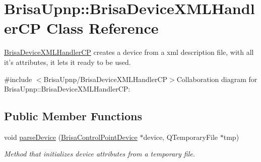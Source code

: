 \hypertarget{classBrisaUpnp_1_1BrisaDeviceXMLHandlerCP}{
\section{BrisaUpnp::BrisaDeviceXMLHandlerCP Class Reference}
\label{classBrisaUpnp_1_1BrisaDeviceXMLHandlerCP}
}


\hyperlink{classBrisaUpnp_1_1BrisaDeviceXMLHandlerCP}{BrisaDeviceXMLHandlerCP} creates a device from a xml description file, with all it's attributes, it lets it ready to be used.  


{\ttfamily \#include $<$BrisaUpnp/BrisaDeviceXMLHandlerCP$>$}Collaboration diagram for BrisaUpnp::BrisaDeviceXMLHandlerCP:\subsection*{Public Member Functions}
\begin{DoxyCompactItemize}
\item 
void \hyperlink{classBrisaUpnp_1_1BrisaDeviceXMLHandlerCP_a1d6d0b57a31c77b174c08e8ddaedea04}{parseDevice} (\hyperlink{classBrisaUpnp_1_1BrisaControlPointDevice}{BrisaControlPointDevice} $\ast$device, QTemporaryFile $\ast$tmp)
\begin{DoxyCompactList}\small\item\em Method that initializes device attributes from a temporary file. \item\end{DoxyCompactList}\end{DoxyCompactItemize}
